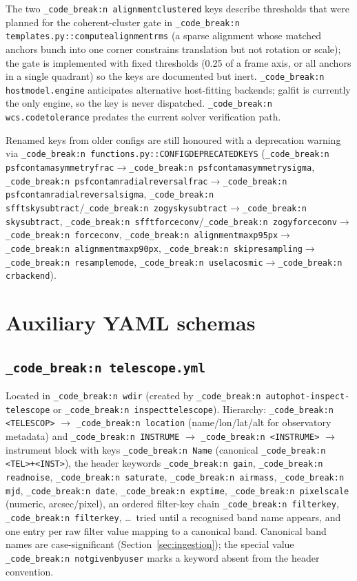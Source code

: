 \documentclass[11pt,a4paper]{article}
\renewcommand{\_}{\autophotunderscore\allowbreak}
\DeclareRobustCommand{\code}[1]{\texttt{\autophot_code_break:n {#1}}}
\begin{document}
The two \code{alignment\_clustered\_*} keys describe thresholds that were
planned for the coherent-cluster gate in
\code{templates.py::compute\_alignment\_rms} (a sparse alignment whose
matched anchors bunch into one corner constrains translation but not
rotation or scale); the gate is implemented with fixed thresholds (0.25
of a frame axis, or all anchors in a single quadrant) so the keys are
documented but inert. \code{host\_model.engine} anticipates alternative
host-fitting backends; galfit is currently the only engine, so the key is
never dispatched. \code{wcs.code\_tolerance} predates the current solver
verification path.

Renamed keys from older configs are still
honoured with a deprecation warning via
\code{functions.py::\_CONFIG\_DEPRECATED\_KEYS}
(\code{psf\_contam\_asymmetry\_frac}$\to$\code{psf\_contam\_asymmetry\_sigma},
\code{psf\_contam\_radial\_reversal\_frac}$\to$\code{psf\_contam\_radial\_reversal\_sigma},
\code{sfft\_sky\_subtract}/\code{zogy\_sky\_subtract}$\to$\code{sky\_subtract},
\code{sfft\_forceconv}/\code{zogy\_forceconv}$\to$\code{forceconv},
\code{alignment\_max\_p95\_px}$\to$\code{alignment\_max\_p90\_px},
\code{skip\_resampling}$\to$\code{resample\_mode},
\code{use\_lacosmic}$\to$\code{cr\_backend}).



\section{Auxiliary YAML schemas}
\label{app:schema}

\subsection{\texorpdfstring{\code{telescope.yml}}{telescope.yml}}

Located in \code{wdir} (created by \code{autophot-inspect-telescope} or
\code{inspect\_telescope}). Hierarchy:
\code{<TELESCOP>} $\to$ \code{location} (name/lon/lat/alt for observatory
metadata) and \code{INSTRUME} $\to$ \code{<INSTRUME>} $\to$ instrument
block with keys \code{Name} (canonical \code{<TEL>+<INST>}), the header
keywords \code{gain}, \code{readnoise}, \code{saturate}, \code{airmass},
\code{mjd}, \code{date}, \code{exptime}, \code{pixel\_scale} (numeric,
arcsec/pixel), an ordered filter-key chain \code{filter\_key\_0},
\code{filter\_key\_1}, \dots\ tried until a recognised band name appears,
and one entry per raw filter value mapping to a canonical band. Canonical
band names are case-significant (Section~\ref{sec:ingestion}); the
special value \code{not\_given\_by\_user} marks a keyword absent from the
header convention.
\end{document}
